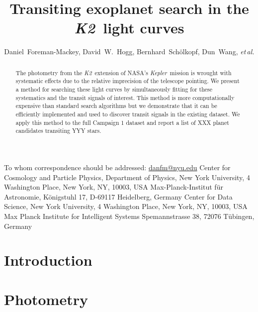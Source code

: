 \documentclass[12pt,preprint]{aastex}
\newcommand{\project}[1]{\emph{#1}}
\newcommand{\kepler}{\project{Kepler}}
\newcommand{\KT}{\project{K2}}
\newcommand{\foreign}[1]{\emph{#1}}
\newcommand{\etal}{\foreign{et\,al.}}
\begin{document}
\title{%
    Transiting exoplanet search in the \KT\ light curves
}

\newcommand{\nyu}{2}
\newcommand{\mpia}{3}
\newcommand{\cds}{4}
\newcommand{\mpis}{5}
\author{%
    Daniel~Foreman-Mackey\altaffilmark{1,\nyu},
    David~W.~Hogg\altaffilmark{\nyu,\mpia,\cds},
    Bernhard~Sch\"olkopf\altaffilmark{\mpis},
    Dun~Wang\altaffilmark{\nyu},
    \etal
}
         {To whom correspondence should be addressed:
                          \url{danfm@nyu.edu}}
\altaffiltext{\nyu}      {Center for Cosmology and Particle Physics,
                          Department of Physics, New York University,
                          4 Washington Place, New York, NY, 10003, USA}
\altaffiltext{\mpia}     {Max-Planck-Institut f\"ur Astronomie,
                          K\"onigstuhl 17, D-69117 Heidelberg, Germany}
\altaffiltext{\cds}      {Center for Data Science,
                          New York University,
                          4 Washington Place, New York, NY, 10003, USA}
\altaffiltext{\mpis}     {Max Planck Institute for Intelligent Systems
                          Spemannstrasse 38, 72076 T\"ubingen, Germany}

\begin{abstract}

The photometry from the \KT\ extension of NASA's \kepler\ mission is wrought
with systematic effects due to the relative imprecision of the telescope
pointing.
We present a method for searching these light curves by simultaneously
fitting for these systematics and the transit signals of interest.
This method is more computationally expensive than standard search algorithms
but we demonstrate that it can be efficiently implemented and used to
discover transit signals in the existing dataset.
We apply this method to the full Campaign 1 dataset and report a list of XXX
planet candidates transiting YYY stars.

\end{abstract}


\section{Introduction}

\section{Photometry}
\end{document}
